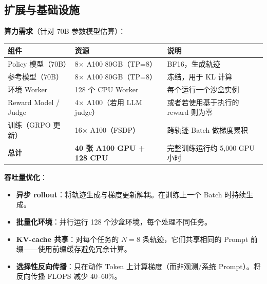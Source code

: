 \subsection{扩展与基础设施}
\label{scaling-and-infrastructure}

\textbf{算力需求}（针对 70B 参数模型估算）：

\noindent\begin{tabularx}{\linewidth}{@{}Z{0.8} Z{0.9} Z{1.3}@{}}
\toprule
\textbf{组件} & \textbf{资源} & \textbf{说明} \\
\midrule
Policy 模型（70B） & 8$\times$ A100 80GB（TP=8） & BF16，生成轨迹 \\
参考模型（70B） & 8$\times$ A100 80GB（TP=8） & 冻结，用于 KL 计算 \\
环境 Worker & 128 个 CPU Worker & 每个运行一个沙盒实例 \\
Reward Model / Judge & 4$\times$ A100（若用 LLM judge） & 或者若使用基于执行的 reward 则为零 \\
训练（GRPO 更新） & 16$\times$ A100（FSDP） & 跨轨迹 Batch 做梯度累积 \\
\textbf{总计} & \textbf{40 张 A100 GPU + 128 CPU} & 完整训练运行约 5,000 GPU 小时 \\
\bottomrule
\end{tabularx}

\textbf{吞吐量优化}：

\begin{itemize}
  \item \textbf{异步 rollout}：将轨迹生成与梯度更新解耦。在训练上一个 Batch 时持续生成。
  \item \textbf{批量化环境}：并行运行 128 个沙盒环境，每个处理不同任务。
  \item \textbf{KV-cache 共享}：对每个任务的 $N=8$ 条轨迹，它们共享相同的 Prompt 前缀——使用前缀缓存避免冗余计算。
  \item \textbf{选择性反向传播}：只在动作 Token 上计算梯度（而非观测/系统 Prompt）。将反向传播 FLOPS 减少 40--60\%。
\end{itemize}

